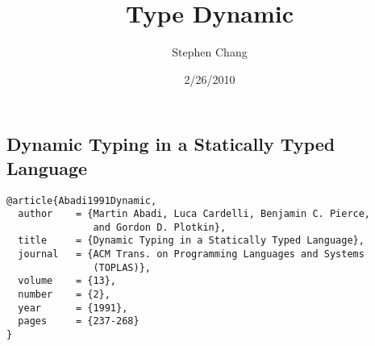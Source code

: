 \documentclass[letterpaper]{llncs}
\begin{document}
\newcommand{\Dynamic}{\texttt{Dynamic}\xspace}
\newcommand{\typecase}{\texttt{typecase}\xspace}
\newcommand{\dynamic}{\texttt{dynamic}\xspace}

\title{Type Dynamic}
\author{Stephen Chang}
\date{2/26/2010}
\maketitle

\subsection*{Dynamic Typing in a Statically Typed Language}%

\begin{verbatim}
@article{Abadi1991Dynamic,
  author    = {Martin Abadi, Luca Cardelli, Benjamin C. Pierce, 
               and Gordon D. Plotkin},
  title     = {Dynamic Typing in a Statically Typed Language},
  journal   = {ACM Trans. on Programming Languages and Systems 
               (TOPLAS)},
  volume    = {13},
  number    = {2},
  year      = {1991},
  pages     = {237-268}
}
\end{verbatim}

\end{document}
